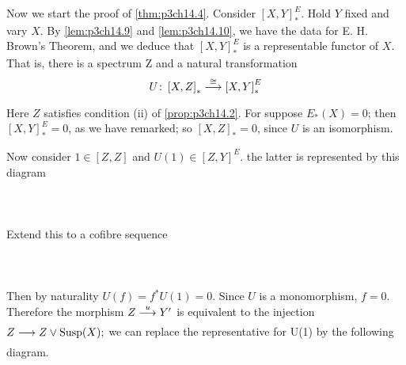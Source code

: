 \documentclass[../main]{subfiles}
\begin{document}
Now we start the proof of \ref{thm:p3ch14.4}. Consider $ \left[X,Y\right]^E_{\ast}$. Hold $Y$ fixed and vary $X$. By \ref{lem:p3ch14.9} and \ref{lem:p3ch14.10}, we have the data for E. H. Brown's Theorem, and we deduce that  $ \left[X,Y\right]^E_{\ast}$ is a representable functor of $X$. That is, there is a spectrum Z and a natural transformation
\[
U\colon \left[X,Z\right]_{\ast} \vra{\cong} \left[X,Y\right]^E_{\ast}
\] 
Here $Z$ satisfies condition (ii) of \ref{prop:p3ch14.2}. For suppose $E_{\ast}(X)=0$; then $\left[X,Y\right]^E_{\ast}=0$, as we have remarked; so $\left[X,Z\right]_{\ast}=0$, since $U$ is an isomorphism.

Now consider $1 \in \left[ Z,Z \right] $ and $U(1) \in \left[Z,Y\right]^E  $. the latter is represented by this diagram
~\\~\\
~\\~\\
Extend this to a cofibre sequence 
~\\~\\
~\\~\\
Then by naturality $U(f)=f^\ast U(1)=0$. Since $U$ is a monomorphism, $f=0$. Therefore the morphism $Z\vra{u} Y'  $ is equivalent to the injection $Z  \lar{} Z \vee \te{Susp}(X);$ we can replace the representative for U(1) by the following diagram.
~\\~\\
~\\~\\
\end{document}
